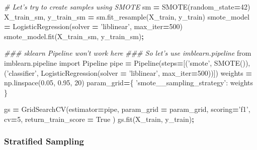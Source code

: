 \documentclass[]{article}
\newenvironment{Shaded}{\begin{snugshade}}{\end{snugshade}}
\newcommand{\CommentTok}[1]{\textcolor[rgb]{0.56,0.35,0.01}{\textit{#1}}}
\newcommand{\DecValTok}[1]{\textcolor[rgb]{0.00,0.00,0.81}{#1}}
\newcommand{\FloatTok}[1]{\textcolor[rgb]{0.00,0.00,0.81}{#1}}
\newcommand{\ImportTok}[1]{#1}
\newcommand{\NormalTok}[1]{#1}
\newcommand{\OperatorTok}[1]{\textcolor[rgb]{0.81,0.36,0.00}{\textbf{#1}}}
\newcommand{\StringTok}[1]{\textcolor[rgb]{0.31,0.60,0.02}{#1}}
\newcommand{\VariableTok}[1]{\textcolor[rgb]{0.00,0.00,0.00}{#1}}
\begin{document}
\begin{Shaded}
\begin{Highlighting}[]
\CommentTok{# Let's try to create samples using SMOTE}
\NormalTok{sm }\OperatorTok{=}\NormalTok{ SMOTE(random_state}\OperatorTok{=}\DecValTok{42}\NormalTok{)}
\NormalTok{X_train_sm, y_train_sm }\OperatorTok{=}\NormalTok{ sm.fit_resample(X_train, y_train)}
\NormalTok{smote_model }\OperatorTok{=}\NormalTok{ LogisticRegression(solver }\OperatorTok{=} \StringTok{'liblinear'}\NormalTok{, max_iter}\OperatorTok{=}\DecValTok{500}\NormalTok{)}
\NormalTok{smote_model.fit(X_train_sm, y_train_sm)}\OperatorTok{;}

\CommentTok{### sklearn Pipeline won't work here}
\CommentTok{### So let's use imblearn.pipeline}
\ImportTok{from}\NormalTok{ imblearn.pipeline }\ImportTok{import}\NormalTok{ Pipeline}
\NormalTok{pipe }\OperatorTok{=}\NormalTok{ Pipeline(steps}\OperatorTok{=}\NormalTok{[(}\StringTok{'smote'}\NormalTok{, SMOTE()),}
\NormalTok{                       (}\StringTok{'classifier'}\NormalTok{, LogisticRegression(solver }\OperatorTok{=} \StringTok{'liblinear'}\NormalTok{, max_iter}\OperatorTok{=}\DecValTok{500}\NormalTok{))])}
\NormalTok{weights }\OperatorTok{=}\NormalTok{ np.linspace(}\FloatTok{0.05}\NormalTok{, }\FloatTok{0.95}\NormalTok{, }\DecValTok{20}\NormalTok{)}
\NormalTok{param_grid}\OperatorTok{=}\NormalTok{\{}
    \StringTok{'smote__sampling_strategy'}\NormalTok{: weights}
\NormalTok{\}}

\NormalTok{gs }\OperatorTok{=}\NormalTok{ GridSearchCV(estimator}\OperatorTok{=}\NormalTok{pipe,  }
\NormalTok{                  param_grid }\OperatorTok{=}\NormalTok{ param_grid, }
\NormalTok{                  scoring}\OperatorTok{=}\StringTok{'f1'}\NormalTok{,}
\NormalTok{                  cv}\OperatorTok{=}\DecValTok{5}\NormalTok{,}
\NormalTok{                  return_train_score }\OperatorTok{=} \VariableTok{True}
\NormalTok{                 )}
\NormalTok{gs.fit(X_train, y_train)}\OperatorTok{;}
\end{Highlighting}
\end{Shaded}

\hypertarget{stratified-sampling}{%
\subsubsection{Stratified Sampling}\label{stratified-sampling}}
\end{document}
